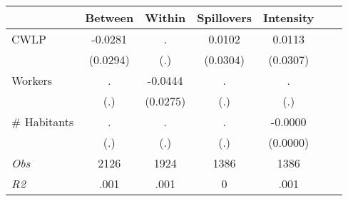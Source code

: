\begin{tabular}{l*{6}{c}}\hline&\multicolumn{1}{c}{Between}&\multicolumn{1}{c}{Within}&\multicolumn{1}{c}{Spillovers}&\multicolumn{1}{c}{Intensity}\\ \hline 
CWLP & -0.0281 & . & 0.0102 & 0.0113 \\
 & (0.0294) & (.) & (0.0304) & (0.0307) \\
Workers & . & -0.0444 & . & . \\
 & (.) & (0.0275) & (.) & (.) \\
\# Habitants & . & . & . & -0.0000 \\
  & (.) & (.) & (.) & (0.0000) \\
\hline \textit{Obs} & 2126 & 1924 & 1386 & 1386  \\ \textit{R2} & .001 & .001 & 0 & .001 \\ \hline \end{tabular}
